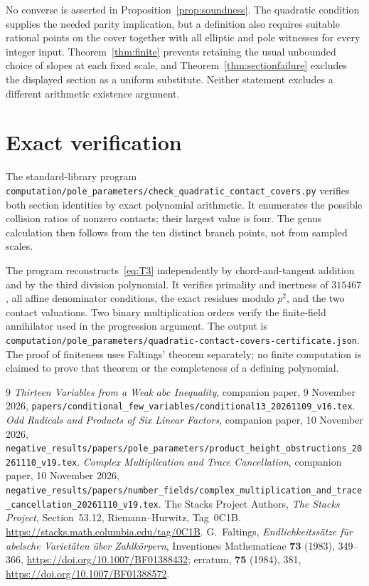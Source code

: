 \documentclass[11pt,a4paper]{article}
\begin{document}
No converse is asserted in Proposition~\ref{prop:soundness}.
The quadratic condition supplies the needed parity implication,
but a definition also requires suitable rational points on the
cover together with all elliptic and pole witnesses for every
integer input. Theorem~\ref{thm:finite} prevents retaining the
usual unbounded choice of slopes at each fixed scale, and
Theorem~\ref{thm:sectionfailure} excludes the displayed section
as a uniform substitute. Neither statement excludes a different
arithmetic existence argument.

\section{Exact verification}

The standard-library program
\nolinkurl{computation/pole_parameters/check_quadratic_contact_covers.py}
verifies both section identities by exact polynomial arithmetic.
It enumerates the possible collision ratios of nonzero contacts;
their largest value is four. The genus calculation then follows
from the ten distinct branch points, not from sampled scales.

The program reconstructs~\eqref{eq:T3} independently by
chord-and-tangent addition and by the third division polynomial.
It verifies primality and inertness of $315467$, all affine
denominator conditions, the exact residues modulo $p^2$, and
the two contact valuations. Two binary multiplication orders
verify the finite-field annihilator used in the progression
argument. The output is
\nolinkurl{computation/pole_parameters/quadratic-contact-covers-certificate.json}.
The proof of finiteness uses Faltings' theorem separately;
no finite computation is claimed to prove that theorem or
the completeness of a defining polynomial.

\begin{thebibliography}{9}
\emph{Thirteen Variables from a Weak $abc$ Inequality},
companion paper, 9 November 2026,
\nolinkurl{papers/conditional_few_variables/conditional13_20261109_v16.tex}.
\emph{Odd Radicals and Products of Six Linear Factors},
companion paper, 10 November 2026,
\nolinkurl{negative_results/papers/pole_parameters/product_height_obstructions_20261110_v19.tex}.
\emph{Complex Multiplication and Trace Cancellation},
companion paper, 10 November 2026,
\nolinkurl{negative_results/papers/number_fields/complex_multiplication_and_trace_cancellation_20261110_v19.tex}.
The Stacks Project Authors, \emph{The Stacks Project},
Section~53.12, Riemann--Hurwitz, Tag~0C1B.
\url{https://stacks.math.columbia.edu/tag/0C1B}.
G.~Faltings, \emph{Endlichkeitss\"atze f\"ur abelsche Variet\"aten
\"uber Zahlk\"orpern}, Inventiones Mathematicae \textbf{73} (1983),
349--366, \url{https://doi.org/10.1007/BF01388432};
erratum, \textbf{75} (1984), 381,
\url{https://doi.org/10.1007/BF01388572}.
\end{thebibliography}
\end{document}
